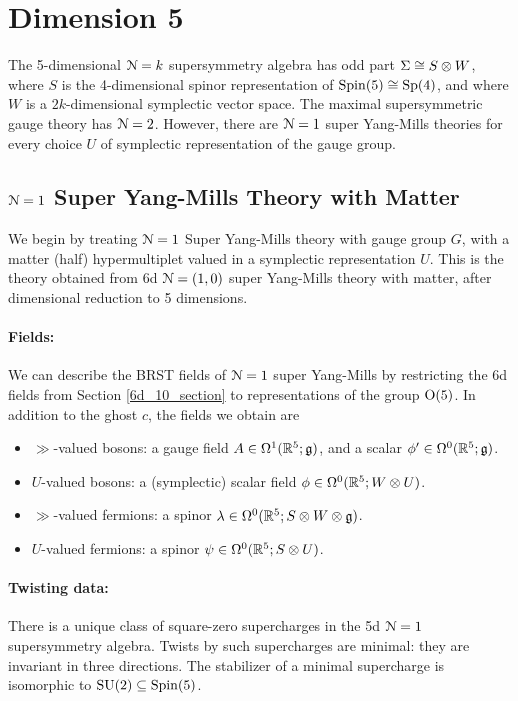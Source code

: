 \documentclass[10pt, oneside]{article}
\begin{document}
\section{Dimension 5}
The 5-dimensional $\mathcal{N}=k$ supersymmetry algebra has odd part $\Sigma \cong S \otimes W$, where $S$ is the 4-dimensional spinor representation of $\mathrm{Spin}(5) \cong \mathrm{Sp}(4)$, and where $W$ is a $2k$-dimensional symplectic vector space.  The maximal supersymmetric gauge theory has $\mathcal{N}=2$.  However, there are $\mathcal{N}=1$ super Yang-Mills theories for every choice $U$ of symplectic representation of the gauge group.

\subsection{\texorpdfstring{$\mathcal{N} = 1$}{N=1} Super Yang-Mills Theory with Matter}  \label{5d_1_section}
We begin by treating $\mathcal{N}=1$ Super Yang-Mills theory with gauge group $G$, with a matter (half) hypermultiplet valued in a symplectic representation $U$.  This is the theory obtained from 6d $\mathcal{N}=(1,0)$ super Yang-Mills theory with matter, after dimensional reduction to 5 dimensions.

\vspace{-10pt}
\paragraph{Fields:} We can describe the BRST fields of $\mathcal{N}=1$ super Yang-Mills by restricting the 6d fields from Section \ref{6d_10_section} to representations of the group $\mathrm{O}(5)$.  In addition to the ghost $c$, the fields we obtain are
\begin{itemize}
 \item $\gg$-valued bosons: a gauge field $A \in \Omega^1(\mathbb R^5; \mathfrak{g})$, and a scalar $\phi' \in \Omega^0(\mathbb R^5; \mathfrak{g})$.
 \item $U$-valued bosons: a (symplectic) scalar field $\phi \in \Omega^0(\mathbb R^5; W \otimes U)$.
 \item $\gg$-valued fermions: a spinor $\lambda \in \Omega^0(\mathbb R^5; S \otimes W \otimes \mathfrak{g})$.
 \item $U$-valued fermions: a spinor $\psi \in \Omega^0(\mathbb R^5; S \otimes U)$.
\end{itemize}

\vspace{-10pt}
\paragraph{Twisting data:}
There is a unique class of square-zero supercharges in the 5d $\mathcal{N}=1$ supersymmetry algebra.  Twists by such supercharges are minimal: they are invariant in three directions.  The stabilizer of a minimal supercharge is isomorphic to $\mathrm{SU}(2) \subseteq \mathrm{Spin}(5)$.
\end{document}
